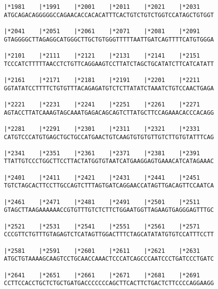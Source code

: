 \documentclass{article}
\begin{document}
\begin{Verbatim}
|*1981    |*1991    |*2001    |*2011    |*2021    |*2031    
ATGCAGACAGGGGGCCAGAACACCACACATTTCACTGTCTGTCTGGTCCATAGCTGTGGT
                                                            
|*2041    |*2051    |*2061    |*2071    |*2081    |*2091    
GTAGGGGCTTAGAGGCATGGGCTTGCTGTGGGTTTTTAATTGATCAGTTTTCATGTGGGA
                                                            
|*2101    |*2111    |*2121    |*2131    |*2141    |*2151    
TCCCATCTTTTTAACCTCTGTTCAGGAAGTCCTTATCTAGCTGCATATCTTCATCATATT
                                                            
|*2161    |*2171    |*2181    |*2191    |*2201    |*2211    
GGTATATCCTTTTCTGTGTTTACAGAGATGTCTCTTATATCTAAATCTGTCCAACTGAGA
                                                            
|*2221    |*2231    |*2241    |*2251    |*2261    |*2271    
AGTACCTTATCAAAGTAGCAAATGAGACAGCAGTCTTATGCTTCCAGAAACACCCACAGG
                                                            
|*2281    |*2291    |*2301    |*2311    |*2321    |*2331    
CATGTCCCATGTGAGCTGCTGCCATGAACTGTCAAGTGTGTGTTGTCTTGTGTATTTCAG
                                                            
|*2341    |*2351    |*2361    |*2371    |*2381    |*2391    
TTATTGTCCCTGGCTTCCTTACTATGGTGTAATCATGAAGGAGTGAAACATCATAGAAAC
                                                            
|*2401    |*2411    |*2421    |*2431    |*2441    |*2451    
TGTCTAGCACTTCCTTGCCAGTCTTTAGTGATCAGGAACCATAGTTGACAGTTCCAATCA
                                                            
|*2461    |*2471    |*2481    |*2491    |*2501    |*2511    
GTAGCTTAAGAAAAAACCGTGTTTGTCTCTTCTGGAATGGTTAGAAGTGAGGGAGTTTGC
                                                            
|*2521    |*2531    |*2541    |*2551    |*2561    |*2571    
CCCGTTCTGTTTGTAGAGTCTCATAGTTGGACTTTCTAGCATATATGTGTCCATTTCCTT
                                                            
|*2581    |*2591    |*2601    |*2611    |*2621    |*2631    
ATGCTGTAAAAGCAAGTCCTGCAACCAAACTCCCATCAGCCCAATCCCTGATCCCTGATC
                                                            
|*2641    |*2651    |*2661    |*2671    |*2681    |*2691    
CCTTCCACCTGCTCTGCTGATGACCCCCCCAGCTTCACTTCTGACTCTTCCCCAGGAAGG
                                                            

\end{Verbatim}
\end{document}
